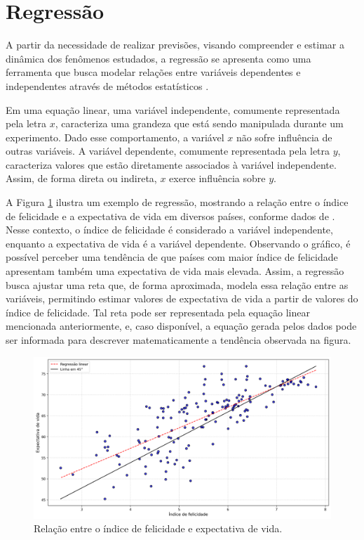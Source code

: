 \section{Regressão}
\label{sec:regressao}

A partir da necessidade de realizar previsões, visando compreender e estimar a dinâmica dos fenômenos estudados, a regressão se apresenta como uma ferramenta que busca modelar relações entre variáveis dependentes e independentes através de métodos estatísticos \cite{soto2013}.

Em uma equação linear, uma variável independente, comumente representada pela letra $x$, caracteriza uma grandeza que está sendo manipulada durante um experimento. Dado esse comportamento, a variável $x$ não sofre influência de outras variáveis. A variável dependente, comumente representada pela letra $y$, caracteriza valores que estão diretamente associados à variável independente. Assim, de forma direta ou indireta, $x$ exerce influência sobre $y$.

A Figura \ref{fig:regressao_exemplo} ilustra um exemplo de regressão, mostrando a relação entre o índice de felicidade e a expectativa de vida em diversos países, conforme dados de \cite{helliwell2020}. Nesse contexto, o índice de felicidade é considerado a variável independente, enquanto a expectativa de vida é a variável dependente. Observando o gráfico, é possível perceber uma tendência de que países com maior índice de felicidade apresentam também uma expectativa de vida mais elevada. Assim, a regressão busca ajustar uma reta que, de forma aproximada, modela essa relação entre as variáveis, permitindo estimar valores de expectativa de vida a partir de valores do índice de felicidade. Tal reta pode ser representada pela equação linear mencionada anteriormente, e, caso disponível, a equação gerada pelos dados pode ser informada para descrever matematicamente a tendência observada na figura.

\begin{figure}[H]
	\caption{\label{fig:regressao_exemplo}Relação entre o índice de felicidade e expectativa de vida.}
	\begin{center}
		\includegraphics[scale=0.4]{figuras/happiness_world.png}
	\end{center}
\end{figure}

